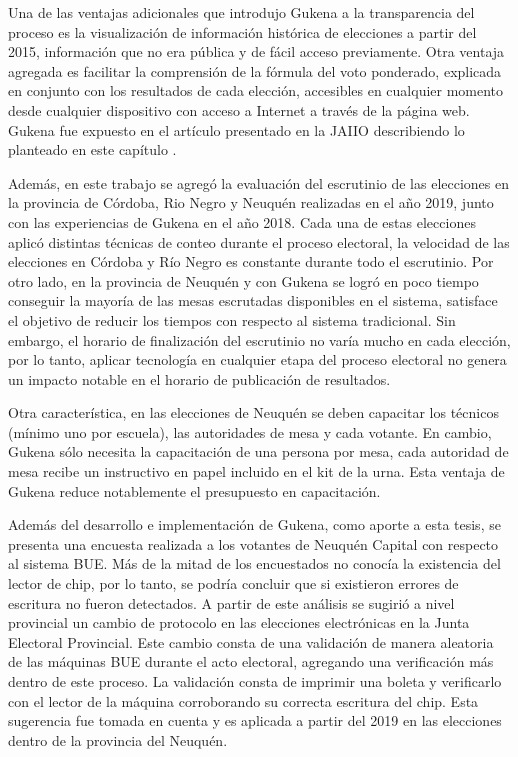 Una de las ventajas adicionales que introdujo Gukena a la transparencia del proceso es la visualización de información histórica de elecciones a partir del 2015, información que no era pública y de fácil acceso previamente. Otra ventaja agregada es facilitar la comprensión de la fórmula del voto ponderado, explicada en conjunto con los resultados de cada elección, accesibles en cualquier momento desde cualquier dispositivo con acceso a Internet a través de la página web. Gukena fue expuesto en el artículo presentado en la JAIIO describiendo lo planteado en este capítulo \cite{articuloGukena}.

Además, en este trabajo se agregó la evaluación del escrutinio de las elecciones en la provincia de Córdoba, Rio Negro y Neuquén realizadas en el año 2019, junto con las experiencias de Gukena en el año 2018. Cada una de estas elecciones aplicó distintas técnicas de conteo durante el proceso electoral, la velocidad de las elecciones en Córdoba y Río Negro es constante durante todo el escrutinio. Por otro lado, en la provincia de Neuquén y con Gukena se logró en poco tiempo conseguir la mayoría de las mesas escrutadas disponibles en el sistema, satisface el objetivo de reducir los tiempos con respecto al sistema tradicional. Sin embargo, el horario de finalización del escrutinio no varía mucho en cada elección, por lo tanto, aplicar tecnología en cualquier etapa del proceso electoral no genera un impacto notable en el horario de publicación de resultados.

Otra característica, en las elecciones de Neuquén se deben capacitar los técnicos (mínimo uno por escuela), las autoridades de mesa y cada votante. En cambio, Gukena sólo necesita la capacitación de una persona por mesa, cada autoridad de mesa recibe un instructivo en papel incluido en el kit de la urna. Esta ventaja de Gukena reduce notablemente el presupuesto en capacitación.

Además del desarrollo e implementación de Gukena, como aporte a esta tesis, se presenta una encuesta realizada a los votantes de Neuquén Capital con respecto al sistema BUE. Más de la mitad de los encuestados no conocía la existencia del lector de chip, por lo tanto, se podría concluir que si existieron errores de escritura no fueron detectados. A partir de este análisis se sugirió a nivel provincial un cambio de protocolo en las elecciones electrónicas en la Junta Electoral Provincial. Este cambio consta de una validación de manera aleatoria de las máquinas BUE durante el acto electoral, agregando una verificación más dentro de este proceso. La validación consta de imprimir una boleta y verificarlo con el lector de la máquina corroborando su correcta escritura del chip. Esta sugerencia fue tomada en cuenta y es aplicada a partir del 2019 en las elecciones dentro de la provincia del Neuquén.


